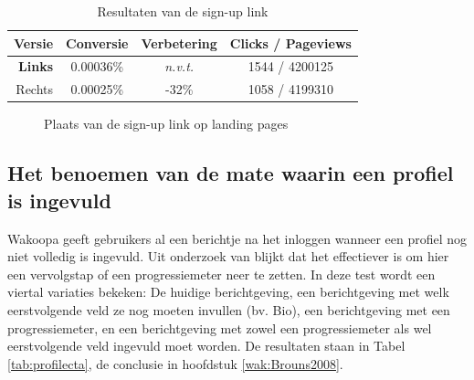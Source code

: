 \documentclass[a4paper, 10pt, pdftex]{report}
\begin{document}
      \begin{table}[ht]
      \centering
      \begin{tabular}{r|*{3}{c}}
        \textbf{Versie}  & Conversie  & Verbetering & Clicks / Pageviews \\ \hline
        \textbf{Links}   & 0.00036\%  & \emph{n.v.t.}        & 1544 / 4200125 \\
        Rechts  & 0.00025\%  & -32\%                & 1058 / 4199310 \\
      \end{tabular}
      \caption{Resultaten van de sign-up link}
      \label{tab:signupcta}
      \end{table}

      \begin{figure}
        \caption{Plaats van de sign-up link op landing pages}
      \end{figure}

    \subsection{Het benoemen van de mate waarin een profiel is ingevuld}
      \label{profileprogress}
      Wakoopa geeft gebruikers al een berichtje na het inloggen wanneer een profiel nog niet volledig is ingevuld. Uit onderzoek van \cite{Brouns2008} blijkt dat het effectiever is om hier een vervolgstap of een progressiemeter neer te zetten. In deze test wordt een viertal variaties bekeken: De huidige berichtgeving, een berichtgeving met welk eerstvolgende veld ze nog moeten invullen (bv. Bio), een berichtgeving met een progressiemeter, en een berichtgeving met zowel een progressiemeter als wel eerstvolgende veld ingevuld moet worden.  De resultaten staan in Tabel \ref{tab:profilecta}, de conclusie in hoofdstuk \ref{wak:Brouns2008}.
\end{document}

